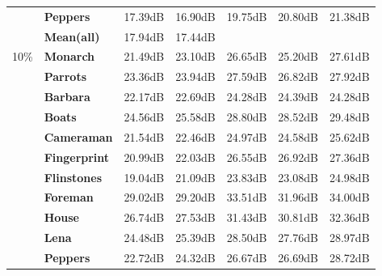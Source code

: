 \documentclass[review]{elsarticle}
\begin{document}
\begin{table}[h!]
\begin{tabular}{|p{0.5cm}|p{1.7cm}ccccc|}
		& \textbf{Peppers}          & 17.39dB           & 16.90dB                       & {19.75dB} & {\color[HTML]{0000FF} 20.80dB} & {\color[HTML]{CC0000} 21.38dB} \\
		& \cellcolor[HTML]{BCCCFF}\textbf{Mean(all)}        & \cellcolor[HTML]{BCCCFF}17.94dB           & \cellcolor[HTML]{BCCCFF}17.44dB                       & \cellcolor[HTML]{BCCCFF}{20.33dB} & \cellcolor[HTML]{BCCCFF}{\color[HTML]{0000FF} 20.59dB} & \cellcolor[HTML]{BCCCFF}{\color[HTML]{CC0000} 21.27dB} \\
		\hline
		\multirow{12}{0.5cm}{10\%} & \textbf{Monarch}     & 21.49dB           & 23.10dB          & {\color[HTML]{0000FF} 26.65dB} & {25.20dB} & {\color[HTML]{CC0000} 27.61dB} \\
		& \textbf{Parrots}     & 23.36dB           & 23.94dB          & {\color[HTML]{0000FF} 27.59dB} & {26.82dB} & {\color[HTML]{CC0000} 27.92dB} \\
		& \textbf{Barbara}     & 22.17dB           & 22.69dB          & {\color[HTML]{0000FF} 24.28dB} & {\color[HTML]{CC0000} 24.39dB} & {\color[HTML]{0000FF} 24.28dB} \\
		& \textbf{Boats}       & 24.56dB           & 25.58dB          & {\color[HTML]{0000FF} 28.80dB} & {28.52dB} & {\color[HTML]{CC0000} 29.48dB} \\
		& \textbf{Cameraman}   & 21.54dB           & 22.46dB          & {\color[HTML]{0000FF} 24.97dB} & {24.58dB} & {\color[HTML]{CC0000} 25.62dB} \\
		& \textbf{Fingerprint} & 20.99dB           & 22.03dB          & {26.55dB} & {\color[HTML]{0000FF} 26.92dB} & {\color[HTML]{CC0000} 27.36dB} \\
		& \textbf{Flinstones}  & 19.04dB           & 21.09dB          & {\color[HTML]{0000FF} 23.83dB} & {23.08dB} & {\color[HTML]{CC0000} 24.98dB} \\
		& \textbf{Foreman}     & 29.02dB           & 29.20dB          & {\color[HTML]{0000FF} 33.51dB} & {31.96dB} & {\color[HTML]{CC0000} 34.00dB} \\
		& \textbf{House}       & 26.74dB           & 27.53dB          & {\color[HTML]{0000FF} 31.43dB} & {30.81dB} & {\color[HTML]{CC0000} 32.36dB} \\
		& \textbf{Lena}        & 24.48dB           & 25.39dB          & {\color[HTML]{0000FF} 28.50dB} & {27.76dB} & {\color[HTML]{CC0000} 28.97dB} \\
		& \textbf{Peppers}     & 22.72dB           & 24.32dB          & {26.67dB} & {\color[HTML]{0000FF} 26.69dB} & {\color[HTML]{CC0000} 28.72dB} \\

\end{tabular}
\end{table}
\end{document}
